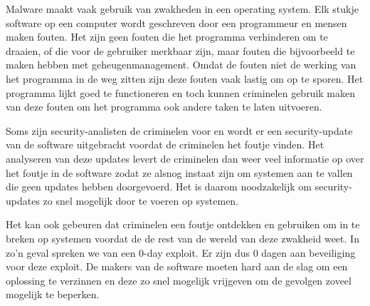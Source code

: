 Malware maakt vaak gebruik van zwakheden in een operating system. Elk stukje software op een computer wordt geschreven door een programmeur en mensen maken fouten. Het zijn geen fouten die het programma verhinderen om te draaien, of die voor de gebruiker merkbaar zijn, maar fouten die bijvoorbeeld te maken hebben met geheugenmanagement. Omdat de fouten niet de werking van het programma in de weg zitten zijn deze fouten vaak lastig om op te sporen. Het programma lijkt goed te functioneren en toch kunnen criminelen gebruik maken van deze fouten om het programma ook andere taken te laten uitvoeren.

Soms zijn security-analisten de criminelen voor en wordt er een security-update van de software uitgebracht voordat de criminelen het foutje vinden. Het analyseren van deze updates levert de criminelen dan weer veel informatie op over het foutje in de software zodat ze alsnog instaat zijn om systemen aan te vallen die geen updates hebben doorgevoerd. Het is daarom noodzakelijk om security-updates zo snel mogelijk door te voeren op systemen.

Het kan ook gebeuren dat criminelen een foutje ontdekken en gebruiken om in te breken op systemen voordat de de rest van de wereld van deze zwakheid weet. In zo'n geval spreken we van een 0-day exploit. Er zijn dus 0 dagen aan beveiliging voor deze exploit. De makers van de software moeten hard aan de slag om een oplossing te verzinnen en deze zo snel mogelijk vrijgeven om de gevolgen zoveel mogelijk te beperken.

